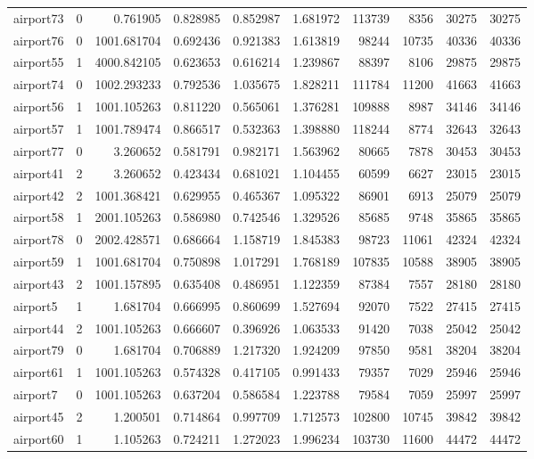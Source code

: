 \begin{longtable}{|l|r|r|r|r|r|r|r|r|r|}
airport73 & 0 & 0.761905 & 0.828985 & 0.852987 & 1.681972 & 113739 & 8356 & 30275 & 30275 \\
airport76 & 0 & 1001.681704 & 0.692436 & 0.921383 & 1.613819 & 98244 & 10735 & 40336 & 40336 \\
airport55 & 1 & 4000.842105 & 0.623653 & 0.616214 & 1.239867 & 88397 & 8106 & 29875 & 29875 \\
airport74 & 0 & 1002.293233 & 0.792536 & 1.035675 & 1.828211 & 111784 & 11200 & 41663 & 41663 \\
airport56 & 1 & 1001.105263 & 0.811220 & 0.565061 & 1.376281 & 109888 & 8987 & 34146 & 34146 \\
airport57 & 1 & 1001.789474 & 0.866517 & 0.532363 & 1.398880 & 118244 & 8774 & 32643 & 32643 \\
airport77 & 0 & 3.260652 & 0.581791 & 0.982171 & 1.563962 & 80665 & 7878 & 30453 & 30453 \\
airport41 & 2 & 3.260652 & 0.423434 & 0.681021 & 1.104455 & 60599 & 6627 & 23015 & 23015 \\
airport42 & 2 & 1001.368421 & 0.629955 & 0.465367 & 1.095322 & 86901 & 6913 & 25079 & 25079 \\
airport58 & 1 & 2001.105263 & 0.586980 & 0.742546 & 1.329526 & 85685 & 9748 & 35865 & 35865 \\
airport78 & 0 & 2002.428571 & 0.686664 & 1.158719 & 1.845383 & 98723 & 11061 & 42324 & 42324 \\
airport59 & 1 & 1001.681704 & 0.750898 & 1.017291 & 1.768189 & 107835 & 10588 & 38905 & 38905 \\
airport43 & 2 & 1001.157895 & 0.635408 & 0.486951 & 1.122359 & 87384 & 7557 & 28180 & 28180 \\
airport5 & 1 & 1.681704 & 0.666995 & 0.860699 & 1.527694 & 92070 & 7522 & 27415 & 27415 \\
airport44 & 2 & 1001.105263 & 0.666607 & 0.396926 & 1.063533 & 91420 & 7038 & 25042 & 25042 \\
airport79 & 0 & 1.681704 & 0.706889 & 1.217320 & 1.924209 & 97850 & 9581 & 38204 & 38204 \\
airport61 & 1 & 1001.105263 & 0.574328 & 0.417105 & 0.991433 & 79357 & 7029 & 25946 & 25946 \\
airport7 & 0 & 1001.105263 & 0.637204 & 0.586584 & 1.223788 & 79584 & 7059 & 25997 & 25997 \\
airport45 & 2 & 1.200501 & 0.714864 & 0.997709 & 1.712573 & 102800 & 10745 & 39842 & 39842 \\
airport60 & 1 & 1.105263 & 0.724211 & 1.272023 & 1.996234 & 103730 & 11600 & 44472 & 44472 \\

\end{longtable}
